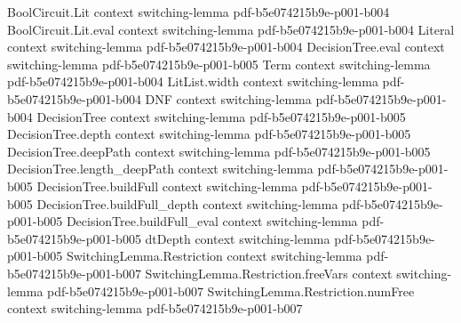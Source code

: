 \begin{theorem}
\label{LMN.normalform_one_step_switching}
\leanok
{}
\proofstep
  {BoolCircuit.Lit}
  {context}
  {switching-lemma}
  {pdf-b5e074215b9e-p001-b004}
\proofstep
  {BoolCircuit.Lit.eval}
  {context}
  {switching-lemma}
  {pdf-b5e074215b9e-p001-b004}
\proofstep
  {Literal}
  {context}
  {switching-lemma}
  {pdf-b5e074215b9e-p001-b004}
\proofstep
  {DecisionTree.eval}
  {context}
  {switching-lemma}
  {pdf-b5e074215b9e-p001-b005}
\proofstep
  {Term}
  {context}
  {switching-lemma}
  {pdf-b5e074215b9e-p001-b004}
\proofstep
  {LitList.width}
  {context}
  {switching-lemma}
  {pdf-b5e074215b9e-p001-b004}
\proofstep
  {DNF}
  {context}
  {switching-lemma}
  {pdf-b5e074215b9e-p001-b004}
\proofstep
  {DecisionTree}
  {context}
  {switching-lemma}
  {pdf-b5e074215b9e-p001-b005}
\proofstep
  {DecisionTree.depth}
  {context}
  {switching-lemma}
  {pdf-b5e074215b9e-p001-b005}
\proofstep
  {DecisionTree.deepPath}
  {context}
  {switching-lemma}
  {pdf-b5e074215b9e-p001-b005}
\proofstep
  {DecisionTree.length_deepPath}
  {context}
  {switching-lemma}
  {pdf-b5e074215b9e-p001-b005}
\proofstep
  {DecisionTree.buildFull}
  {context}
  {switching-lemma}
  {pdf-b5e074215b9e-p001-b005}
\proofstep
  {DecisionTree.buildFull_depth}
  {context}
  {switching-lemma}
  {pdf-b5e074215b9e-p001-b005}
\proofstep
  {DecisionTree.buildFull_eval}
  {context}
  {switching-lemma}
  {pdf-b5e074215b9e-p001-b005}
\proofstep
  {dtDepth}
  {context}
  {switching-lemma}
  {pdf-b5e074215b9e-p001-b005}
\proofstep
  {SwitchingLemma.Restriction}
  {context}
  {switching-lemma}
  {pdf-b5e074215b9e-p001-b007}
\proofstep
  {SwitchingLemma.Restriction.freeVars}
  {context}
  {switching-lemma}
  {pdf-b5e074215b9e-p001-b007}
\proofstep
  {SwitchingLemma.Restriction.numFree}
  {context}
  {switching-lemma}
  {pdf-b5e074215b9e-p001-b007}

\end{theorem}
